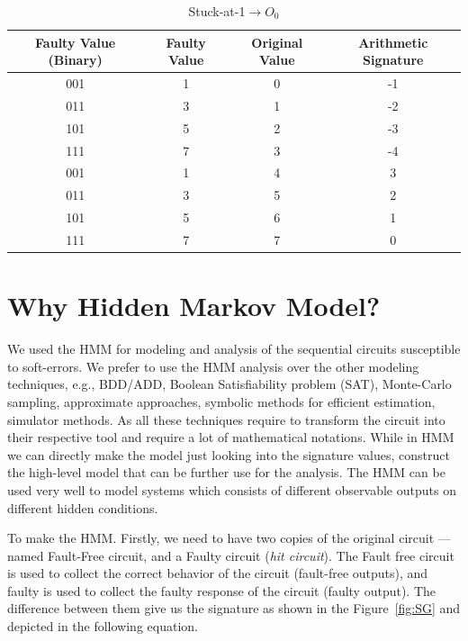 \begin{table}[tb!]
\center
\caption{Stuck-at-1$\rightarrow O_0$}

\label{s@1-O0}

\begin{tabular}{|c | c| c | c| } 
 \hline
 \rowcolor{lightgray}
Faulty Value (Binary) & Faulty Value & Original Value & Arithmetic Signature   \\ 
\hline

 
 
 001& 1 &0 & -1  \\
 \hline
 011 & 3 & 1 & -2 \\ 
 \hline
 
 101 & 5 & 2 & -3 \\
 \hline
 111& 7& 3& -4 \\
 \hline
 001 & 1  &  4& 3 \\
 \hline
 011 & 3 & 5 &2  \\
 \hline
 101 & 5 & 6 & 1 \\
 \hline
 111 & 7 & 7 & 0 \\
 \hline
 
 
\end{tabular}
\end{table}




\section{Why Hidden Markov Model?}


We used the HMM for modeling and analysis of the sequential circuits susceptible to soft-errors. We prefer to use the HMM analysis over the other modeling techniques, e.g., BDD/ADD, Boolean Satisfiability problem (SAT), Monte-Carlo sampling, approximate approaches, symbolic methods for efficient estimation, simulator methods. As all these techniques require to transform the circuit into their respective tool and require a lot of mathematical notations. While in HMM we can directly make the model just looking into the signature values, construct the high-level model that can be further use for the analysis. The HMM can be used very well to model systems which consists of different observable outputs on different hidden conditions.

To make the HMM. Firstly, we need to have two copies of the original circuit --- named Fault-Free circuit, and a Faulty circuit (\textit{hit circuit}). The Fault free circuit is used to collect the correct behavior of the circuit (fault-free outputs), and faulty is used to collect the faulty response of the circuit (faulty output). The difference between them give us the signature as shown in the Figure~\ref{fig:SG} and depicted in the following equation.

